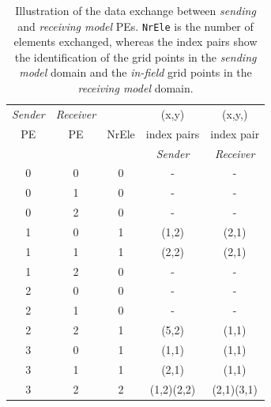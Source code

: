 \documentclass[twoside]{article}
\begin{document}
\begin{table}
\begin{center}
\begin{tabular}{|ccccc|} \hline
{\it Sender} & {\it Receiver} &       & (x,y)  & (x,y,) \\
 PE    & PE    & NrEle & index pairs & index pair \\
      &        &       &  {\it Sender} & {\it Receiver}\\  \hline
 0  &  0   &  0 & -&- \\
 0  &  1   &  0 & -&-  \\
 0  &  2   &  0 & -&-  \\
 1  &  0   &  1 & (1,2) & (2,1) \\
 1  &  1   &  1 & (2,2) & (2,1) \\
 1  &  2   &  0 & -&-  \\
 2  &  0   &  0 & -&-  \\
 2  &  1   &  0 & -&-  \\
 2  &  2   &  1 & (5,2) & (1,1)\\
 3  &  0   &  1 & (1,1) & (1,1)\\
 3  &  1   &  1 & (2,1) & (1,1)\\
 3  &  2   &  2 & (1,2)(2,2) & (2,1)(3,1)\\ \hline
\end{tabular}
\end{center}
\caption{Illustration of the data exchange between {\it sending} and
 {\it receiving model} PEs.
{\tt NrEle} is the number of elements exchanged, whereas the index
pairs show the identification of the grid points in the {\it sending
model} domain and the {\it in-field}  grid points in the {\it
receiving model} domain.}  
\label{tab:ex1}
\end{table}
\end{document}
